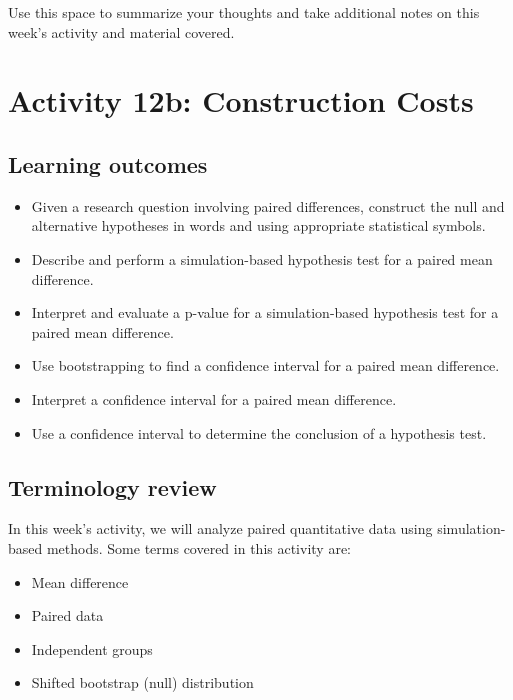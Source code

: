 \documentclass[
]{report}
\begin{document}
Use this space to summarize your thoughts and take additional notes on this week's activity and material covered.

\newpage

\hypertarget{activity-12b-construction-costs}{%
\section{Activity 12b: Construction Costs}\label{activity-12b-construction-costs}}


\hypertarget{learning-outcomes-8}{%
\subsection{Learning outcomes}\label{learning-outcomes-8}}

\begin{itemize}
\item
  Given a research question involving paired differences, construct the null and alternative hypotheses
  in words and using appropriate statistical symbols.
\item
  Describe and perform a simulation-based hypothesis test for a paired mean difference.
\item
  Interpret and evaluate a p-value for a simulation-based hypothesis test for a paired mean difference.
\item
  Use bootstrapping to find a confidence interval for a paired mean difference.
\item
  Interpret a confidence interval for a paired mean difference.
\item
  Use a confidence interval to determine the conclusion of a hypothesis test.
\end{itemize}

\hypertarget{terminology-review-20}{%
\subsection{Terminology review}\label{terminology-review-20}}

In this week's activity, we will analyze paired quantitative data using simulation-based methods. Some terms covered in this activity are:

\begin{itemize}
\item
  Mean difference
\item
  Paired data
\item
  Independent groups
\item
  Shifted bootstrap (null) distribution
\end{itemize}
\end{document}
